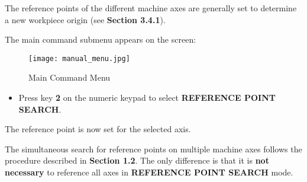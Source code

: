 The reference points of the different machine axes are generally set to determine a new workpiece origin (see \textbf{Section 3.4.1}).

\procedure

\begin{itemize}
\end{itemize}

\vspace{.5cm}

\begin{itemize}
\end{itemize}
\vspace{.5cm}
The main command submenu appears on the screen:

\begin{figure}[h]
    \centering
    \texttt{[image: manual\_menu.jpg]}
    \caption{Main Command Menu}
\end{figure}

\begin{itemize}
    \item Press key \textbf{2} on the numeric keypad to select \textbf{REFERENCE POINT SEARCH}.
\end{itemize}

\begin{itemize}
\end{itemize}

\vspace{.5cm}

\begin{itemize}
\end{itemize}

\vspace{.5cm}

\begin{itemize}
\end{itemize}
\vspace{.5cm}
The reference point is now set for the selected axis.

\begin{itemize}
\end{itemize}

\vspace{.5cm}

\notes

The simultaneous search for reference points on multiple machine axes follows the procedure described in \textbf{Section 1.2}. The only difference is that it is \textbf{not necessary} to reference all axes in \textbf{REFERENCE POINT SEARCH} mode.